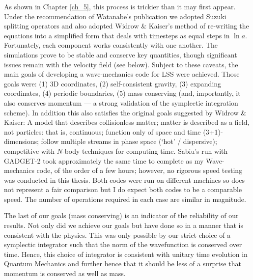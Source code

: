 As shown in Chapter \ref{ch_5}, this process is trickier than it may first appear. Under the recommendation of Watanabe's publication we adopted Suzuki splitting operators and also adopted Widrow \& Kaiser's method of re-writing the equations into a simplified form that deals with timesteps as equal steps in $\ln a$. Fortunately, each component works consistently with one another. The simulations prove to be stable and conserve key quantities, though significant issues remain with the velocity field (see below). Subject to these caveats, the main goals of developing a wave-mechanics code for LSS were achieved. Those goals were: (1) 3D coordinates, (2) self-consistent gravity, (3) expanding coordinates, (4) periodic boundaries, (5) mass conserving (and, importantly, it also conserves momentum --- a strong validation of the symplectic integration scheme). In addition this also satisfies the original goals suggested by Widrow \& Kaiser: A model that describes collisionless matter; matter is described as a field, not particles: that is, continuous; function only of space and time (3+1)-dimensions; follow multiple streams in phase space (`hot' / dispersive); competitive with $N$-body techniques for computing time. Sabiu's run with GADGET-2 took approximately the same time to complete as my Wave-mechanics code, of the order of a few hours; however, no rigorous speed testing was conducted in this thesis. Both codes were run on different machines so does not represent a fair comparison but I do expect both codes to be a comparable speed. The number of operations required in each case are similar in magnitude.

The last of our goals (mass conserving) is an indicator of the reliability of our results. Not only did we achieve our goals but have done so in a manner that is consistent with the physics. This was only possible by our strict choice of a symplectic integrator such that the norm of the wavefunction is conserved over time. Hence, this choice of integrator is consistent with unitary time evolution in Quantum Mechanics and further hence that it should be less of a surprise that momentum is conserved as well as mass.

